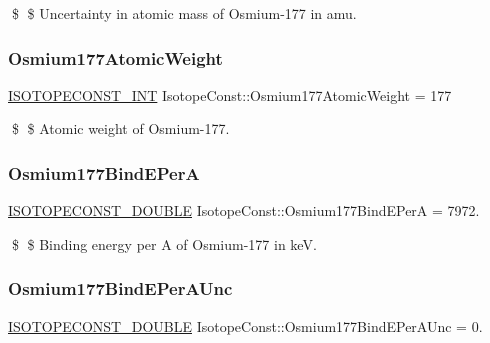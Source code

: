 \$ \$ Uncertainty in atomic mass of Osmium-\/177 in amu. \mbox{\label{group___isotope_const-_osmium-_os177_ga532e8c15fecac1a8176a2f7274732838}} 
\subsubsection{\texorpdfstring{Osmium177\+Atomic\+Weight}{Osmium177AtomicWeight}}
{\footnotesize\ttfamily \mbox{\hyperlink{group___isotope_const-_macros_ga5f18360b3e99483a35c32d789e62621c}{I\+S\+O\+T\+O\+P\+E\+C\+O\+N\+S\+T\+\_\+\+I\+NT}} Isotope\+Const\+::\+Osmium177\+Atomic\+Weight = 177}

\$ \$ Atomic weight of Osmium-\/177. \mbox{\label{group___isotope_const-_osmium-_os177_gad3af3e6f8c35772caeb9384e4e145bd0}} 
\subsubsection{\texorpdfstring{Osmium177\+Bind\+E\+PerA}{Osmium177BindEPerA}}
{\footnotesize\ttfamily \mbox{\hyperlink{group___isotope_const-_macros_ga8f45a7272ce02c0b4c65c44636ed719a}{I\+S\+O\+T\+O\+P\+E\+C\+O\+N\+S\+T\+\_\+\+D\+O\+U\+B\+LE}} Isotope\+Const\+::\+Osmium177\+Bind\+E\+PerA = 7972.}

\$ \$ Binding energy per A of Osmium-\/177 in keV. \mbox{\label{group___isotope_const-_osmium-_os177_ga80e8d357e3fdf0b5c183c6fb1ce7be5f}} 
\subsubsection{\texorpdfstring{Osmium177\+Bind\+E\+Per\+A\+Unc}{Osmium177BindEPerAUnc}}
{\footnotesize\ttfamily \mbox{\hyperlink{group___isotope_const-_macros_ga8f45a7272ce02c0b4c65c44636ed719a}{I\+S\+O\+T\+O\+P\+E\+C\+O\+N\+S\+T\+\_\+\+D\+O\+U\+B\+LE}} Isotope\+Const\+::\+Osmium177\+Bind\+E\+Per\+A\+Unc = 0.}

